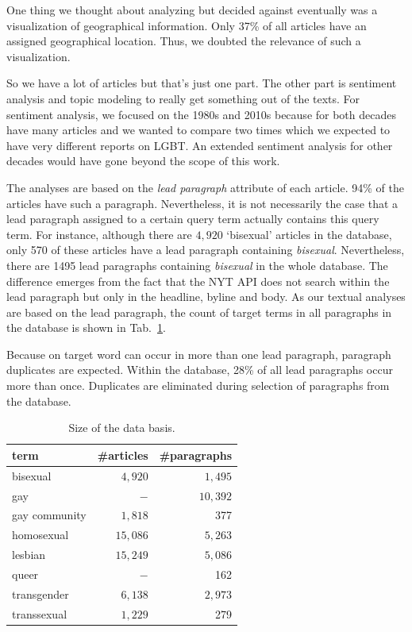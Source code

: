 \documentclass[10pt,a4paper,twocolumn]{scrartcl}
\begin{document}
One thing we thought about analyzing but decided against eventually was a visualization of geographical information. Only 37\% of all articles have an assigned geographical location. Thus, we doubted the relevance of such a visualization.

So we have a lot of articles but that's just one part. The other part is sentiment analysis and topic modeling to really get something out of the texts. For sentiment analysis, we focused on the 1980s and 2010s because for both decades have many articles and we wanted to compare two times which we expected to have very different reports on LGBT. An extended sentiment analysis for other decades would have gone beyond the scope of this work.

The analyses are based on the \textit{lead paragraph} attribute of each article. 94\% of the articles have such a paragraph. Nevertheless, it is not necessarily the case that a lead paragraph assigned to a certain query term actually contains this query term. For instance, although there are $4,920$ `bisexual' articles in the database, only 570 of these articles have a lead paragraph containing \textit{bisexual}. Nevertheless, there are 1495 lead paragraphs containing \textit{bisexual} in the whole database. The difference emerges from the fact that the NYT API does not search within the lead paragraph but only in the headline, byline and body. As our textual analyses are based on the lead paragraph, the count of target terms in all paragraphs in the database is shown in Tab.~\ref{tab:dataBasis}.

Because on target word can occur in more than one lead paragraph, paragraph duplicates are expected. Within the database, 28\% of all lead paragraphs occur more than once. Duplicates are eliminated during selection of paragraphs from the database.

\begin{table}
\centering
\caption{Size of the data basis.} \label{tab:dataBasis}
\begin{tabular}{lrr}
\toprule
term	 & \#articles & \#paragraphs\\
\midrule
bisexual &  $4,920$ & $1,495$\\
gay			& $-$ & $10,392$\\
gay community & $1,818$ & 377\\
homosexual  & $15,086$ & $5,263$\\
lesbian & $15,249$ & $5,086$\\
queer  & $-$ & 162\\
transgender  & $6,138$ & $2,973$\\
transsexual  & $1,229$ & 279\\
\bottomrule
\end{tabular}
\end{table}
\end{document}
